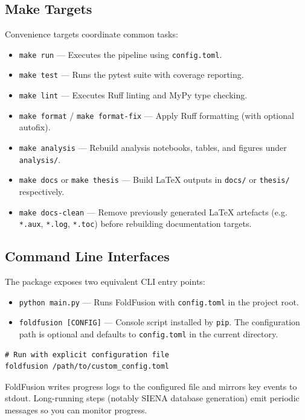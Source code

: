 \documentclass[11pt]{article}
\begin{document}
\subsection{Make Targets}
Convenience targets coordinate common tasks:
\begin{itemize}[noitemsep]
      \item \texttt{make run} --- Executes the pipeline using \texttt{config.toml}.
      \item \texttt{make test} --- Runs the pytest suite with coverage reporting.
      \item \texttt{make lint} --- Executes Ruff linting and MyPy type checking.
      \item \texttt{make format} / \texttt{make format-fix} --- Apply Ruff
            formatting (with optional autofix).
      \item \texttt{make analysis} --- Rebuild analysis notebooks, tables, and
            figures under \texttt{analysis/}.
      \item \texttt{make docs} or \texttt{make thesis} --- Build LaTeX outputs in
            \texttt{docs/} or \texttt{thesis/} respectively.
      \item \texttt{make docs-clean} --- Remove previously generated LaTeX
            artefacts (e.g. \texttt{*.aux}, \texttt{*.log}, \texttt{*.toc}) before
            rebuilding documentation targets.
\end{itemize}

\subsection{Command Line Interfaces}
The package exposes two equivalent CLI entry points:
\begin{itemize}[noitemsep]
      \item \texttt{python main.py} --- Runs FoldFusion with \texttt{config.toml} in
            the project root.
      \item \texttt{foldfusion [CONFIG]} --- Console script installed by
            \texttt{pip}. The configuration path is optional and defaults to
            \texttt{config.toml} in the current directory.
\end{itemize}

\begin{lstlisting}[style=commandline]
# Run with explicit configuration file
foldfusion /path/to/custom_config.toml
\end{lstlisting}

FoldFusion writes progress logs to the configured file and mirrors key events to
stdout. Long-running steps (notably SIENA database generation) emit periodic
messages so you can monitor progress.
\end{document}

